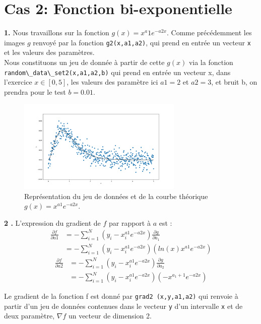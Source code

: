 \documentclass[12pt]{article}
\begin{document}
 \section*{\color{brick} Cas 2:  Fonction bi-exponentielle}
 \textbf{\color{brick}1.} Nous travaillons sur la fonction $g(x) = x^a1 e^{-a2x}$. Comme précédemment les images $g$ renvoyé par la fonction \verb|g2(x,a1,a2)|, qui prend en entrée un vecteur \verb|x| et les valeurs des paramètres.\\
 Nous constituons un jeu de donnée à partir de cette $g(x)$ via la fonction\\
 \verb|random\_data\_set2(x,a1,a2,b)|  qui prend en entrée un vecteur x, dans l'exercice $x \in [0,5]$, les valeurs des paramètre ici $a1 = 2$ et $a2 =3$, et bruit b, on prendra pour le test $b=0.01$.
 
 
  \begin{figure}[H]
\centering
\includegraphics[width=0.7\textwidth]{Q12.png}
\caption{Représentation du jeu de données et de la courbe théorique $g(x)= x^{a1}e^{-a2x}$.}
\label{FigQ12}
\end{figure}

 \textbf{\color{brick}2 .} L'expression du gradient de $f$ par rapport à $a$ est :
 \begin{align*}
     \frac{\partial f}{\partial a1} &= -\sum_{i=1}^N (y_i - x_i^{a1}e^{-a2x})\frac{\partial g}{\partial a_1} \\
     &= -\sum_{i=1}^N (y_i - x_i^{a1}e^{-a2x})(ln(x)x^{a1}e^{-a2x})
 \end{align*}{}
  \begin{align*}
     \frac{\partial f}{\partial a2} &= -\sum_{i=1}^N (y_i - x_i^{a1}e^{-a2x})\frac{\partial g}{\partial a_2} \\
     &= -\sum_{i=1}^N (y_i - x_i^{a1}e^{-a2x})(-x^{a_1+1}e^{-a2x})
 \end{align*}{}
 
 Le gradient de la fonction f est donné par \verb|grad2 (x,y,a1,a2)| qui renvoie à partir d'un jeu de données contenues dans le vecteur \verb|y| d'un intervalle \verb|x| et de deux paramètre, $\nabla f$ un vecteur de dimension 2.
 
\end{document}
